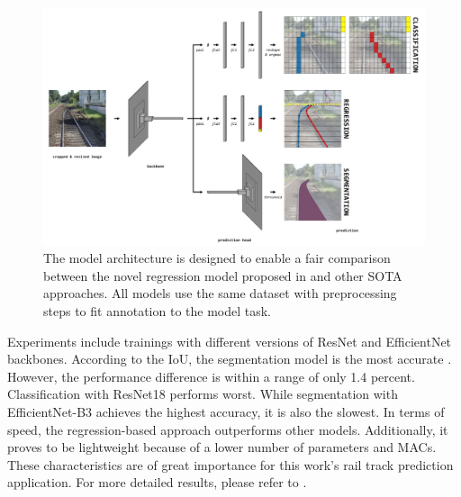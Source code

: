 \begin{figure}[H]
    \centering
    \includegraphics[width=\linewidth]{PICs/Baselinepaper/tep-net_sota_models.jpg}
    \caption{The model architecture is designed to enable a fair comparison between the novel regression model proposed in \cite{tepNet2024} and other \ac{SOTA} approaches.
    All models use the same dataset with preprocessing steps to fit annotation to the model task.}
    \label{fig:TEP-Net_sota_models}
\end{figure}

\noindent Experiments include trainings with different versions of ResNet and EfficientNet backbones.
According to the \ac{IoU}, the segmentation model is the most accurate \cite{tepNet2024}.
However, the performance difference is within a range of only 1.4 percent.
Classification with ResNet18 performs worst.
While segmentation with EfficientNet-B3 achieves the highest accuracy, it is also the slowest.
In terms of speed, the regression-based approach outperforms other models.
Additionally, it proves to be lightweight because of a lower number of parameters and \ac{MACs}.
These characteristics are of great importance for this work's rail track prediction application.
For more detailed results, please refer to \cite{tepNet2024}.

